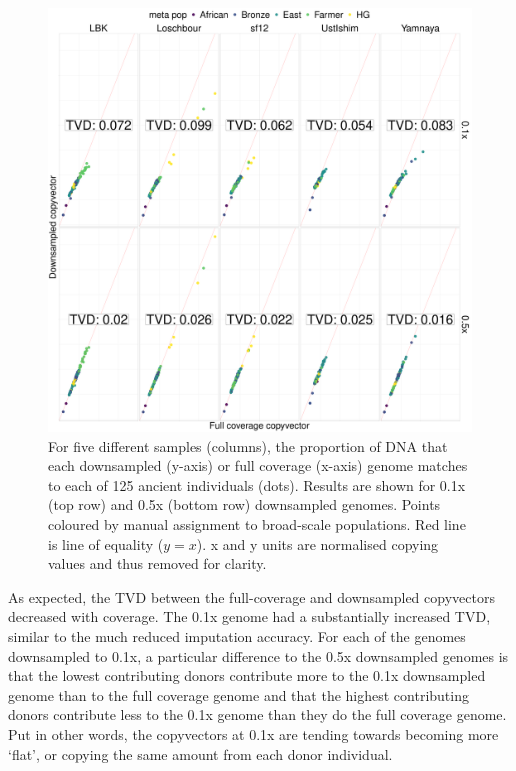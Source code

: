 \begin{figure}[htp]
    \centering
    \includegraphics[width=1.0\textwidth]{../images/chapter1/CP_correlation_allSamples_0.1x_0.5x_30x.pdf}
    \caption{For five different samples (columns), the proportion of DNA that each downsampled (y-axis) or full coverage (x-axis) genome matches to each of 125 ancient individuals (dots). Results are shown for 0.1x (top row) and 0.5x (bottom row) downsampled genomes. Points coloured by manual assignment to broad-scale populations. Red line is line of equality ($y=x$). x and y units are normalised copying values and thus removed for clarity.}
    \label{fig:CP_correlation_allSamples_0.1x_0.5x_30x}
\end{figure}

As expected, the TVD between the full-coverage and downsampled copyvectors decreased with coverage. The 0.1x genome had a substantially increased TVD, similar to the much reduced imputation accuracy. For each of the genomes downsampled to 0.1x, a particular difference to the 0.5x downsampled genomes is that the lowest contributing donors contribute more to the 0.1x downsampled genome than to the full coverage genome and that the highest contributing donors contribute less to the 0.1x genome than they do the full coverage genome. Put in other words, the copyvectors at 0.1x are tending towards becoming more `flat', or copying the same amount from each donor individual. 

